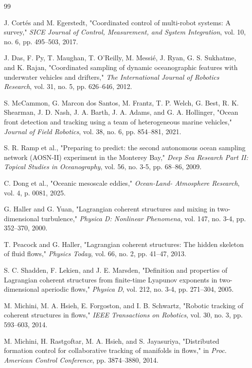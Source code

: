 \documentclass[lettersize,journal]{IEEEtran}
\begin{document}
\begin{thebibliography}{99}

 J. Cortés and M. Egerstedt, "Coordinated control of multi-robot
systems: A survey," \textit{SICE Journal of Control, Measurement, and
System Integration}, vol. 10, no. 6, pp. 495--503, 2017.

 J. Das, F. Py, T. Maughan, T. O'Reilly, M. Messié, J. Ryan,
G. S. Sukhatme, and K. Rajan, "Coordinated sampling of dynamic oceanographic
features with underwater vehicles and drifters," \textit{The International
Journal of Robotics Research}, vol. 31, no. 5, pp. 626--646, 2012.

 S. McCammon, G. Marcon dos Santos, M. Frantz, T. P. Welch,
G. Best, R. K. Shearman, J. D. Nash, J. A. Barth, J. A. Adams, and
G. A. Hollinger, "Ocean front detection and tracking using a
team of heterogeneous marine vehicles," \textit{Journal of Field Robotics},
vol. 38, no. 6, pp. 854--881, 2021.

 S. R. Ramp et al., "Preparing to predict: the second autonomous
ocean sampling network (AOSN-II) experiment in the Monterey Bay,"
\textit{Deep Sea Research Part II: Topical Studies in Oceanography}, vol. 56,
no. 3-5, pp. 68--86, 2009.

 C. Dong et al., "Oceanic mesoscale eddies," \textit{Ocean-Land-
Atmosphere Research}, vol. 4, p. 0081, 2025.

 G. Haller and G. Yuan, "Lagrangian coherent structures and mixing
in two-dimensional turbulence," \textit{Physica D: Nonlinear Phenomena},
vol. 147, no. 3-4, pp. 352--370, 2000.

 T. Peacock and G. Haller, "Lagrangian coherent structures: The
hidden skeleton of fluid flows," \textit{Physics Today}, vol. 66, no. 2,
pp. 41--47, 2013.

 S. C. Shadden, F. Lekien, and J. E. Marsden, "Definition and
properties of Lagrangian coherent structures from finite-time Lyapunov
exponents in two-dimensional aperiodic flows," \textit{Physica D}, vol. 212,
no. 3-4, pp. 271--304, 2005.

 M. Michini, M. A. Hsieh, E. Forgoston, and I. B. Schwartz,
"Robotic tracking of coherent structures in flows," \textit{IEEE Transactions
on Robotics}, vol. 30, no. 3, pp. 593--603, 2014.

 M. Michini, H. Rastgoftar, M. A. Hsieh, and S. Jayasuriya,
"Distributed formation control for collaborative tracking of manifolds in
flows," in \textit{Proc. American Control Conference}, pp. 3874--3880, 2014.


\end{thebibliography}
\end{document}
